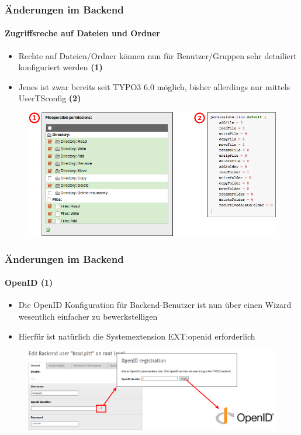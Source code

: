 
\begin{frame}[fragile]
	\frametitle{Änderungen im Backend}
	\framesubtitle{Zugriffsreche auf Dateien und Ordner}

 	\begin{itemize}
		\item Rechte auf Dateien/Ordner können nun für Benutzer/Gruppen sehr detailiert konfiguriert werden
			\begingroup\color{typo3red}\textbf{(1)}\endgroup
		\item Jenes ist zwar bereits seit TYPO3 6.0 möglich, bisher allerdings nur mittels UserTSconfig
			\begingroup\color{typo3red}\textbf{(2)}\endgroup
	\end{itemize}

	\begin{figure}
		\includegraphics[width=0.65\linewidth]{Images/BackendChanges/FileAndDirectoryPermissions.png}
	\end{figure}

\end{frame}


\begin{frame}[fragile]
	\frametitle{Änderungen im Backend}
	\framesubtitle{OpenID (1)}

 	\begin{itemize}
		\item Die OpenID Konfiguration für Backend-Benutzer ist nun über einen Wizard wesentlich einfacher zu bewerkstelligen
		\item Hierfür ist natürlich die Systemextension EXT:openid erforderlich
	\end{itemize}

	\begin{figure}
		\includegraphics[width=0.95\linewidth]{Images/BackendChanges/OpenIdWizard.png}
	\end{figure}

\end{frame}

